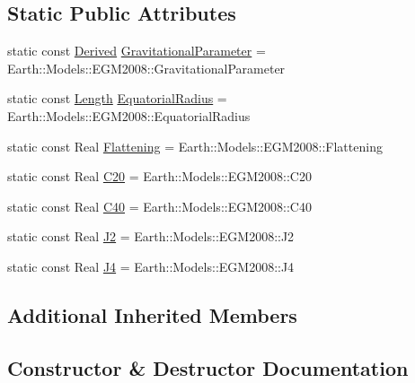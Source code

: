 \subsection*{Static Public Attributes}
\begin{DoxyCompactItemize}
\item 
static const \hyperlink{classostk_1_1physics_1_1units_1_1_derived}{Derived} \hyperlink{classostk_1_1physics_1_1env_1_1obj_1_1celest_1_1_earth_a63bdb61b8a2b26066efc4ba7985c2060}{Gravitational\+Parameter} = Earth\+::\+Models\+::\+E\+G\+M2008\+::\+Gravitational\+Parameter
\item 
static const \hyperlink{classostk_1_1physics_1_1units_1_1_length}{Length} \hyperlink{classostk_1_1physics_1_1env_1_1obj_1_1celest_1_1_earth_ac700d34023a4654da6f781fc097034ad}{Equatorial\+Radius} = Earth\+::\+Models\+::\+E\+G\+M2008\+::\+Equatorial\+Radius
\item 
static const Real \hyperlink{classostk_1_1physics_1_1env_1_1obj_1_1celest_1_1_earth_ad1cb5b01fc6cdf263dd97aa5bcb62b78}{Flattening} = Earth\+::\+Models\+::\+E\+G\+M2008\+::\+Flattening
\item 
static const Real \hyperlink{classostk_1_1physics_1_1env_1_1obj_1_1celest_1_1_earth_a51d8f851ef1f2c199dbf7707d9843eb4}{C20} = Earth\+::\+Models\+::\+E\+G\+M2008\+::\+C20
\item 
static const Real \hyperlink{classostk_1_1physics_1_1env_1_1obj_1_1celest_1_1_earth_a0b6e3b6beaa94ea1ed611395e824ce9d}{C40} = Earth\+::\+Models\+::\+E\+G\+M2008\+::\+C40
\item 
static const Real \hyperlink{classostk_1_1physics_1_1env_1_1obj_1_1celest_1_1_earth_a0c09ef7a4fb1f6d5d077e4108fb4e56a}{J2} = Earth\+::\+Models\+::\+E\+G\+M2008\+::\+J2
\item 
static const Real \hyperlink{classostk_1_1physics_1_1env_1_1obj_1_1celest_1_1_earth_a1bbb48f44c28957851d971e35b628a6b}{J4} = Earth\+::\+Models\+::\+E\+G\+M2008\+::\+J4
\end{DoxyCompactItemize}
\subsection*{Additional Inherited Members}


\subsection{Constructor \& Destructor Documentation}
\mbox{\label{classostk_1_1physics_1_1env_1_1obj_1_1celest_1_1_earth_ae3327b5673664451201468dd16667f42}} 
